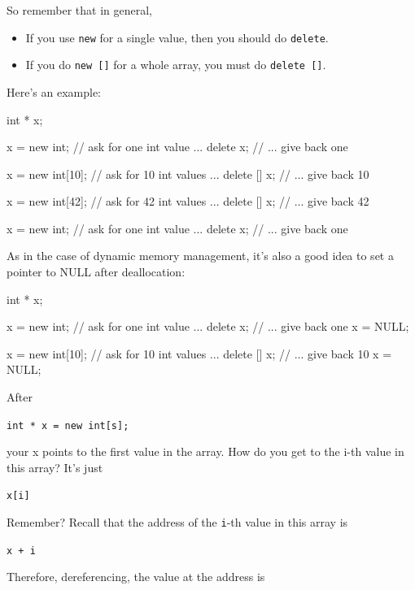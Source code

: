 So remember that in general,

\begin{itemize}
\item If you use \texttt{new} for a single value, then you should do
  \texttt{delete}.
\item If you do \texttt{new []} for a whole array, you must do
  \texttt{delete []}.
\end{itemize}

Here's an example:

\begin{consolethree}[escapeinside=||]
int * x;

x = new int;     // ask for one int value ...
delete x;        // ... give back one

x = new int[10]; // ask for 10 int values ...
delete [] x;     // ... give back 10

x = new int[42]; // ask for 42 int values ...
delete [] x;     // ... give back 42

x = new int;     // ask for one int value ...
delete x;        // ... give back one
\end{consolethree}

As in the case of dynamic memory management, it's also a good idea to set a pointer to NULL after deallocation:

\begin{consolethree}[escapeinside=||]
int * x;

x = new int;     // ask for one int value ...
delete x;        // ... give back one
x = NULL;

x = new int[10]; // ask for 10 int values ...
delete [] x;     // ... give back 10
x = NULL;
\end{consolethree}





After

\verb!int * x = new int[s];!

your x points to the first value in the array. How do you get to the
i-th value in this array? It's just

\texttt{x[i]}

Remember? Recall that the address of the \texttt{i}-th value in this array
is

\texttt{x + i}

Therefore, dereferencing, the value at the address is

